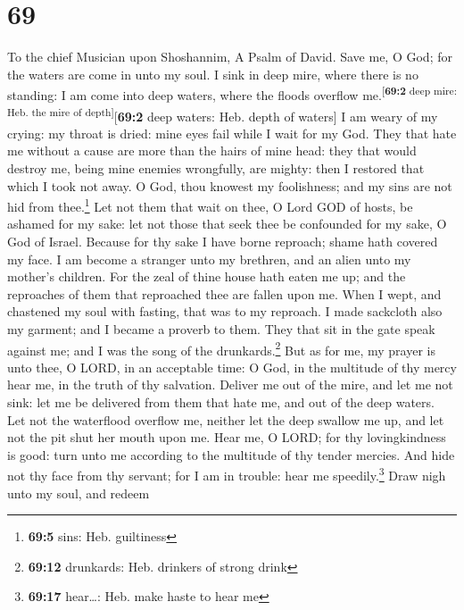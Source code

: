 \hypertarget{section-68}{%
\section{69}\label{section-68}}

To the chief Musician upon Shoshannim, A Psalm of David. 
Save me, O God; for the waters are come in unto my soul. 
I sink in deep mire, where there is no standing: I am come into deep
waters, where the floods overflow me.\textsuperscript{{[}\textbf{69:2}
deep mire: Heb. the mire of depth{]}}{[}\textbf{69:2} deep waters: Heb.
depth of waters{]}  I am weary of my crying: my throat is
dried: mine eyes fail while I wait for my God.  They that
hate me without a cause are more than the hairs of mine head: they that
would destroy me, being mine enemies wrongfully, are mighty: then I
restored that which I took not away.  O God, thou knowest
my foolishness; and my sins are not hid from thee.\footnote{\textbf{69:5}
  sins: Heb. guiltiness}  Let not them that wait on thee,
O Lord GOD of hosts, be ashamed for my sake: let not those that seek
thee be confounded for my sake, O God of Israel.  Because
for thy sake I have borne reproach; shame hath covered my face.
 I am become a stranger unto my brethren, and an alien
unto my mother's children.  For the zeal of thine house
hath eaten me up; and the reproaches of them that reproached thee are
fallen upon me.  When I wept, and chastened my soul with
fasting, that was to my reproach.  I made sackcloth also
my garment; and I became a proverb to them.  They that
sit in the gate speak against me; and I was the song of the
drunkards.\footnote{\textbf{69:12} drunkards: Heb. drinkers of strong
  drink}  But as for me, my prayer is unto thee, O LORD,
in an acceptable time: O God, in the multitude of thy mercy hear me, in
the truth of thy salvation.  Deliver me out of the mire,
and let me not sink: let me be delivered from them that hate me, and out
of the deep waters.  Let not the waterflood overflow me,
neither let the deep swallow me up, and let not the pit shut her mouth
upon me.  Hear me, O LORD; for thy lovingkindness is
good: turn unto me according to the multitude of thy tender mercies.
 And hide not thy face from thy servant; for I am in
trouble: hear me speedily.\footnote{\textbf{69:17} hear\ldots: Heb. make
  haste to hear me}  Draw nigh unto my soul, and redeem
